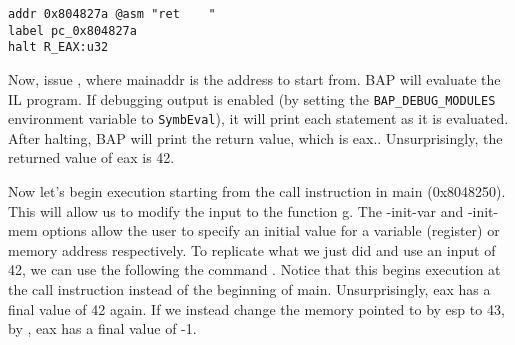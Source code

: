 \begin{verbatim}
addr 0x804827a @asm "ret    "
label pc_0x804827a
halt R_EAX:u32
\end{verbatim}

Now, issue , where
mainaddr is the address to start from.  BAP will evaluate the IL
program.  If debugging output is enabled (by setting the
\texttt{BAP\_DEBUG\_MODULES} environment variable to
\texttt{SymbEval}), it will print each statement as it is evaluated.
After halting, BAP will print the return value, which is
eax.. Unsurprisingly, the returned value of eax is 42.

Now let's begin execution starting from the call instruction in main
(0x8048250). This will allow us to modify the input to the function
g. The -init-var and -init-mem options allow the user to specify an
initial value for a variable (register) or memory address
respectively.  To replicate what we just did and use an input of 42,
we can use the following the command . Notice that this
begins execution at the call instruction instead of the beginning of
main.  Unsurprisingly, eax has a final value of 42 again.  If we
instead change the memory pointed to by esp to 43, by , eax has
a final value of -1.
